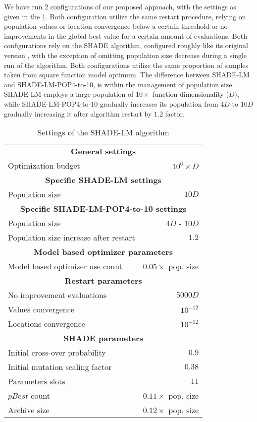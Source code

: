 \documentclass[sigconf]{acmart}
\begin{document}
We have run 2 configurations of our proposed approach,
with the settings as given in the \ref{tab:algorithm-settings}.
Both configuration utilize the same restart procedure,
relying on population values or location convergence
below a certain threshold or no improvements in the global best
value for a certain amount of evaluations.
Both configurations rely on the SHADE algorithm,
configured roughly like its original version \cite{Tanabe2014},
with the exception of omitting population size decrease during
a single run of the algorithm.
Both configurations utilize the same proportion of samples
taken from square function model optimum.
The difference between SHADE-LM and SHADE-LM-POP4-to-10,
is within the management of population size.
SHADE-LM employs a large population of $10 \times$ function dimensionality ($D$),
while SHADE-LM-POP4-to-10 gradually increases its population from
$4D$ to $10D$ gradually increasing it after algorithm restart
by $1.2$ factor.

\begin{table}[!ht]
	\caption{Settings of the SHADE-LM algorithm
	\label{tab:algorithm-settings}}
	\begin{center}
	\begin{tabular}{lr}
		\multicolumn{2}{c}{\textbf{General settings}} \\
		Optimization budget & $10^6 \times D$ \\
		\multicolumn{2}{c}{\textbf{Specific SHADE-LM settings}} \\
		Population size & $10D$ \\
		\multicolumn{2}{c}{\textbf{Specific SHADE-LM-POP4-to-10 settings}} \\
		Population size & $4D$ - $10D$ \\
		Population size increase after restart & $1.2$ \\
		\multicolumn{2}{c}{\textbf{Model based optimizer parameters}} \\
		Model based optimizer use count & $0.05 \times$ pop. size \\
		\multicolumn{2}{c}{\textbf{Restart parameters}} \\
    No improvement evaluations & $5000D$ \\
    Values convergence & $10^{-12}$ \\
    Locations convergence & $10^{-12}$ \\
		\multicolumn{2}{c}{\textbf{SHADE parameters}} \\
		Initial cross-over probability & $0.9$ \\
		Initial mutation scaling factor & $0.38$ \\
    Parameters slots & $11$ \\
    $pBest$ count & $0.11 \times$ pop. size \\
    Archive size & $0.12 \times$ pop. size \\
	\end{tabular}
\end{center}
\end{table}
\end{document}
